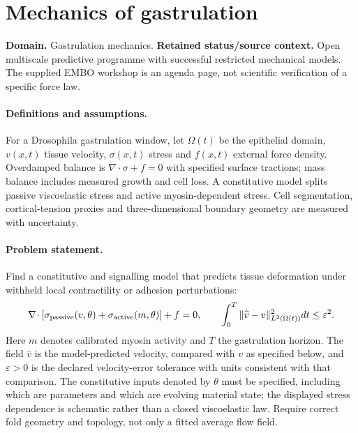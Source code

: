 \documentclass[11pt]{article}
\begin{document}
\section*{Mechanics of gastrulation}
\label{prob:126}
\label{rank:84}
\par\smallskip

\noindent\textbf{Domain.} Gastrulation mechanics. \quad \textbf{Retained status/source context.} Open multiscale predictive programme with successful restricted mechanical models. The supplied EMBO workshop is an agenda page, not scientific verification of a specific force law.
\paragraph{Definitions and assumptions.} For a Drosophila gastrulation window, let $\Omega(t)$ be the epithelial domain, $v(x,t)$ tissue velocity, $\sigma(x,t)$ stress and $f(x,t)$ external force density. Overdamped balance is $\nabla\!\cdot\sigma+f=0$ with specified surface tractions; mass balance includes measured growth and cell loss. A constitutive model splits passive viscoelastic stress and active myosin-dependent stress. Cell segmentation, cortical-tension proxies and three-dimensional boundary geometry are measured with uncertainty.
\paragraph{Problem statement.} Find a constitutive and signalling model that predicts tissue deformation under withheld local contractility or adhesion perturbations:
\[
\nabla\!\cdot[\sigma_{\rm passive}(v,\theta)+\sigma_{\rm active}(m,\theta)]+f=0,
\qquad
\int_0^T\|\widehat v-v\|_{L^2(\Omega(t))}^2dt\leq\varepsilon^2.
\]
Here $m$ denotes calibrated myosin activity and $T$ the gastrulation horizon. The field $\widehat v$ is the model-predicted velocity, compared with $v$ as specified below, and $\varepsilon>0$ is the declared velocity-error tolerance with units consistent with that comparison. The constitutive inputs denoted by $\theta$ must be specified, including which are parameters and which are evolving material state; the displayed stress dependence is schematic rather than a closed viscoelastic law. Require correct fold geometry and topology, not only a fitted average flow field.
\end{document}
